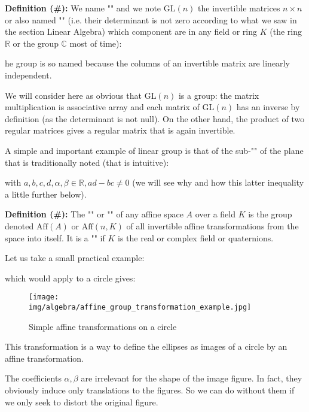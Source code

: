 	\textbf{Definition (\#\mydef):} We name "" and we note $\text{GL}(n)$ the invertible matrices $n\times n$ or also named "" (i.e. their determinant is not zero according to what we saw in the section Linear Algebra) which component are in any field or ring $K$ (the ring $\mathbb{R}$ or the group $\mathbb{C}$ most of time):
	
	he group is so named because the columns of an invertible matrix are linearly independent.
	
	We will consider here as obvious that $\text{GL}(n)$ is a group: the matrix multiplication is associative array and each matrix of $\text{GL} (n)$ has an inverse by definition (as the determinant is not null). On the other hand, the product of two regular matrices gives a regular matrix that is again invertible.
	
	A simple and important example of linear group is that of the sub-"" of the plane that is traditionally noted (that is intuitive):
	
	with $a,b,c,d,\alpha,\beta\in \mathbb{R},ad-bc\neq 0$ (we will see why and how this latter inequality a little further below).
	
	\textbf{Definition (\#\mydef):} The "" or "" of any affine space $A$ over a field $K$ is the group denoted $\text{Aff}(A)$ or $\text{Aff}(n,K)$ of all invertible affine transformations from the space into itself. It is a "" if $K$ is the real or complex field or quaternions.
	
	Let us take a small practical example:
	
	which would apply to a circle gives:
	\begin{figure}[H]
			\centering
			\texttt{[image: img/algebra/affine\_group\_transformation\_example.jpg]}
			\caption{Simple affine transformations on a circle}
		\end{figure}
	This transformation is a way to define the ellipses as images of a circle by an affine transformation.
	
	The coefficients $\alpha,\beta$ are irrelevant for the shape of the image figure. In fact, they obviously induce only translations to the figures. So we can do without them if we only seek to distort the original figure.
	
